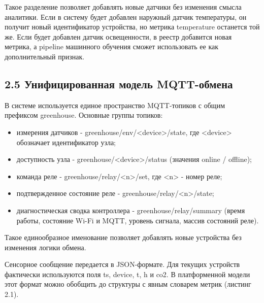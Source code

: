 \documentclass[a4paper,14pt]{extarticle}
\renewcommand{\texttt}[1]{\textnormal{#1}}
\providecommand{\tightlist}{%
  \setlength{\itemsep}{0pt}\setlength{\parskip}{0pt}}
\begin{document}
Такое разделение позволяет добавлять новые датчики без изменения смысла
аналитики. Если в систему будет добавлен наружный датчик температуры, он
получит новый идентификатор устройства, но метрика \texttt{temperature}
останется той же. Если будет добавлен датчик освещенности, в реестр
добавится новая метрика, а pipeline машинного обучения сможет
использовать ее как дополнительный признак.

\hypertarget{ux443ux43dux438ux444ux438ux446ux438ux440ux43eux432ux430ux43dux43dux430ux44f-ux43cux43eux434ux435ux43bux44c-mqtt-ux43eux431ux43cux435ux43dux430}{%
\subsection{2.5 Унифицированная модель
MQTT-обмена}\label{ux443ux43dux438ux444ux438ux446ux438ux440ux43eux432ux430ux43dux43dux430ux44f-ux43cux43eux434ux435ux43bux44c-mqtt-ux43eux431ux43cux435ux43dux430}}

В системе используется единое пространство MQTT-топиков с общим
префиксом \texttt{greenhouse}. Основные группы топиков:

\begin{itemize}
\tightlist
\item
  измерения датчиков -
  \texttt{greenhouse/env/\textless{}device\textgreater{}/state}, где
  \texttt{\textless{}device\textgreater{}} обозначает идентификатор
  узла;
\item
  доступность узла -
  \texttt{greenhouse/\textless{}device\textgreater{}/status} (значения
  \texttt{online} / \texttt{offline});
\item
  команда реле -
  \texttt{greenhouse/relay/\textless{}n\textgreater{}/set}, где
  \texttt{\textless{}n\textgreater{}} - номер реле;
\item
  подтвержденное состояние реле -
  \texttt{greenhouse/relay/\textless{}n\textgreater{}/state};
\item
  диагностическая сводка контроллера - \texttt{greenhouse/relay/summary}
  (время работы, состояние Wi-Fi и MQTT, уровень сигнала, массив
  состояний реле).
\end{itemize}

Такое единообразное именование позволяет добавлять новые устройства без
изменения логики обмена.

Сенсорное сообщение передается в JSON-формате. Для текущих устройств
фактически используются поля \texttt{ts}, \texttt{device}, \texttt{t},
\texttt{h} и \texttt{co2}. В платформенной модели этот формат можно
обобщить до структуры с явным словарем метрик (листинг 2.1).
\end{document}

